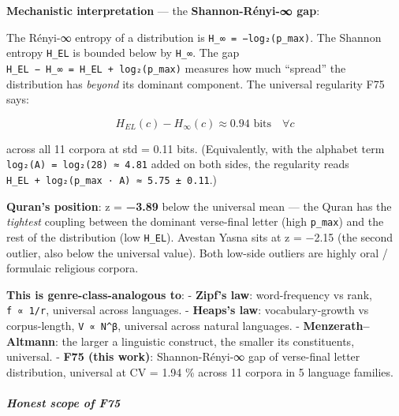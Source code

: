 \documentclass[
]{article}
\begin{document}
\textbf{Mechanistic interpretation} --- the \textbf{Shannon-Rényi-∞
gap}:

The Rényi-∞ entropy of a distribution is
\texttt{H\_∞\ =\ −log₂(p\_max)}. The Shannon entropy \texttt{H\_EL} is
bounded below by \texttt{H\_∞}. The gap
\texttt{H\_EL\ −\ H\_∞\ =\ H\_EL\ +\ log₂(p\_max)} measures how much
``spread'' the distribution has \emph{beyond} its dominant component.
The universal regularity F75 says:

\[H_{EL}(c) - H_{\infty}(c) \approx 0.94 \text{ bits} \quad \forall c\]

across all 11 corpora at std = 0.11 bits. (Equivalently, with the
alphabet term \texttt{log₂(A)\ =\ log₂(28)\ ≈\ 4.81} added on both
sides, the regularity reads
\texttt{H\_EL\ +\ log₂(p\_max\ ·\ A)\ ≈\ 5.75\ ±\ 0.11}.)

\textbf{Quran's position}: z = \textbf{−3.89} below the universal mean
--- the Quran has the \emph{tightest} coupling between the dominant
verse-final letter (high \texttt{p\_max}) and the rest of the
distribution (low \texttt{H\_EL}). Avestan Yasna sits at z = −2.15 (the
second outlier, also below the universal value). Both low-side outliers
are highly oral / formulaic religious corpora.

\textbf{This is genre-class-analogous to}: - \textbf{Zipf's law}:
word-frequency vs rank, \texttt{f\ ∝\ 1/r}, universal across languages.
- \textbf{Heaps's law}: vocabulary-growth vs corpus-length,
\texttt{V\ ∝\ N\^{}β}, universal across natural languages. -
\textbf{Menzerath--Altmann}: the larger a linguistic construct, the
smaller its constituents, universal. - \textbf{F75 (this work)}:
Shannon-Rényi-∞ gap of verse-final letter distribution, universal at CV
= 1.94 \% across 11 corpora in 5 language families.

\subparagraph{Honest scope of F75}\label{honest-scope-of-f75}
\end{document}
